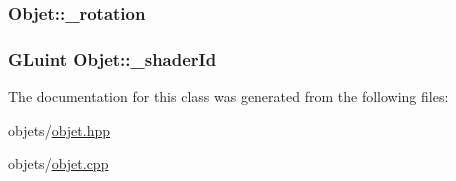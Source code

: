 \hypertarget{class_objet_a1d8675e88cc98ba740292af1421c2ee1}{
\subsubsection[{\+\_\+rotation}]{ Objet\+::\+\_\+rotation\hspace{0.3cm}{\ttfamily [protected]}}}\label{class_objet_a1d8675e88cc98ba740292af1421c2ee1}
\hypertarget{class_objet_af0d545a506dbfa377c8ca5a499fdf755}{
\subsubsection[{\+\_\+shader\+Id}]{\setlength{\rightskip}{0pt plus 5cm}G\+Luint Objet\+::\+\_\+shader\+Id\hspace{0.3cm}{\ttfamily [protected]}}}\label{class_objet_af0d545a506dbfa377c8ca5a499fdf755}


The documentation for this class was generated from the following files\+:\begin{DoxyCompactItemize}
\item 
objets/\hyperlink{objet_8hpp}{objet.\+hpp}\item 
objets/\hyperlink{objet_8cpp}{objet.\+cpp}\end{DoxyCompactItemize}
